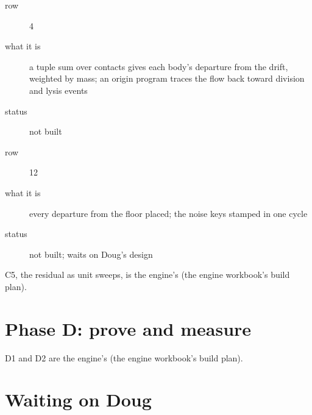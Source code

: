 \begin{description}
\item[{row}] 4
\item[{what it is}] a tuple sum over contacts gives each body's departure from the drift, weighted by mass; an origin program traces the flow back toward division and lysis events
\item[{status}] not built
\end{description}

\begin{description}
\item[{row}] 12
\item[{what it is}] every departure from the floor placed; the noise keys stamped in one cycle
\item[{status}] not built; waits on Doug's design
\end{description}

C5, the residual as unit sweeps, is the engine's (the engine workbook's build plan).

\section{\texorpdfstring{Phase D: prove and measure}{Phase D: prove and measure}}

D1 and D2 are the engine's (the engine workbook's build plan).

\section{\texorpdfstring{Waiting on Doug}{Waiting on Doug}}

